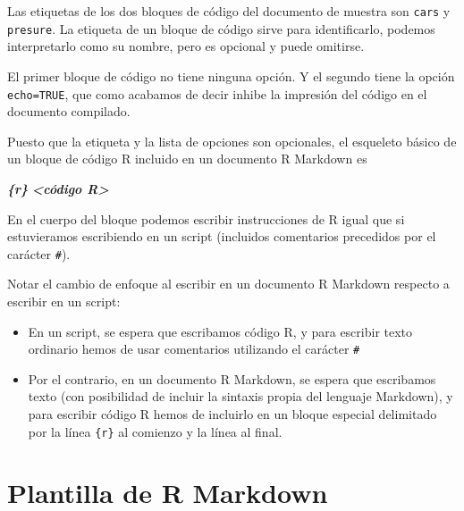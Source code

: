 \documentclass[
  degree=mecinf,
  title=normal,
  toc=normal,
  bib=normal]{mnye}
\newenvironment{Shaded}{\begin{snugshade}}{\end{snugshade}}
\newcommand{\InformationTok}[1]{\textcolor[rgb]{0.56,0.35,0.01}{\textbf{\textit{#1}}}}
\begin{document}
Las etiquetas de los dos bloques de código del documento de muestra son \texttt{cars} y \texttt{presure}. La etiqueta de un bloque de código sirve para identificarlo, podemos interpretarlo como su nombre, pero es opcional y puede omitirse.

El primer bloque de código no tiene ninguna opción. Y el segundo tiene la opción \texttt{echo=TRUE}, que como acabamos de decir inhibe la impresión del código en el documento compilado.

Puesto que la etiqueta y la lista de opciones son opcionales, el esqueleto básico de un bloque de código \textsf{R} incluido en un documento R Markdown es

\begin{Shaded}
\begin{Highlighting}[]
\InformationTok{\textasciigrave{}\textasciigrave{}\textasciigrave{}\{r\}}
\InformationTok{\textless{}código R\textgreater{}}
\InformationTok{\textasciigrave{}\textasciigrave{}\textasciigrave{}}
\end{Highlighting}
\end{Shaded}

En el cuerpo del bloque podemos escribir instrucciones de \textsf{R} igual que si estuvieramos escribiendo en un script (incluidos comentarios precedidos por el carácter \texttt{\#}).

Notar el cambio de enfoque al escribir en un documento R Markdown respecto a escribir en un script:

\begin{itemize}
\item
  En un script, se espera que escribamos código \textsf{R}, y para escribir texto ordinario hemos de usar comentarios utilizando el carácter \texttt{\#}
\item
  Por el contrario, en un documento R Markdown, se espera que escribamos texto (con posibilidad de incluir la sintaxis propia del lenguaje Markdown), y para escribir código \textsf{R} hemos de incluirlo en un bloque especial delimitado por la línea \texttt{\textasciigrave{}\textasciigrave{}\textasciigrave{}\{r\}} al comienzo y la línea \texttt{\textasciigrave{}\textasciigrave{}\textasciigrave{}} al final.
\end{itemize}

\hypertarget{plantilla-de-r-markdown}{%
\section{Plantilla de R Markdown}\label{plantilla-de-r-markdown}}
\end{document}

